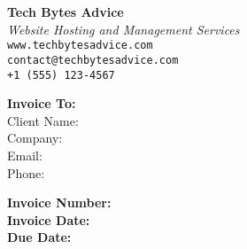 \documentclass[12pt]{article}
\begin{document}
\begin{center}
    {\Huge \textbf{Tech Bytes Advice}}\\[0.5em]
    \textit{Website Hosting and Management Services}\\
    \texttt{www.techbytesadvice.com} \\
    \texttt{contact@techbytesadvice.com} \\
    \texttt{+1 (555) 123-4567}
\end{center}

\vspace{1em}

\noindent
\textbf{Invoice To:} \\
Client Name: \underline{\hspace{6cm}} \\
Company: \underline{\hspace{6cm}} \\
Email: \underline{\hspace{6cm}} \\
Phone: \underline{\hspace{6cm}} \\

\vspace{1em}

\noindent
\textbf{Invoice Number:} \underline{\hspace{2cm}} \\
\textbf{Invoice Date:} \underline{\hspace{3cm}} \\
\textbf{Due Date:} \underline{\hspace{3cm}} \\

\vspace{1em}
\end{document}
